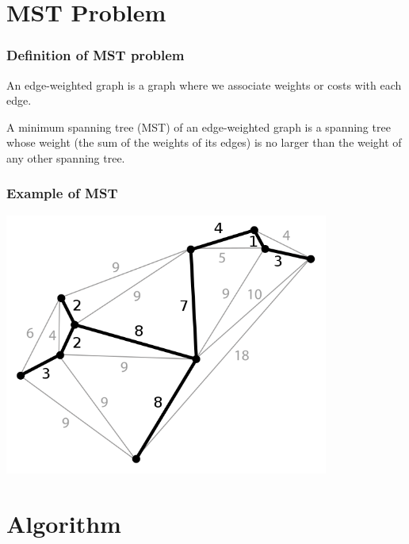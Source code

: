 \documentclass[
	11pt, %
]{beamer}
\begin{document}
\section{MST Problem}
\begin{frame}
    \tableofcontentscurrent
\end{frame}


\begin{frame}
    \frametitle{Definition of MST problem}
    
    \begin{definition}
        An edge-weighted graph is a graph where we 
        associate weights or costs with each edge.
    \end{definition}

    \begin{definition}
        A minimum spanning tree (MST) of an edge-weighted 
        graph is a spanning tree whose weight 
        (the sum of the weights of its edges) is no 
        larger than the weight of any other spanning tree.
    \end{definition}
\end{frame}

\begin{frame}
    \frametitle{Example of MST}
    \begin{center}
        \includegraphics[width = 0.8\textwidth]{images/mst.svg.png}
    \end{center}
\end{frame}

\section{Algorithm}
\begin{frame}
    \tableofcontentscurrent
\end{frame}
\end{document}
